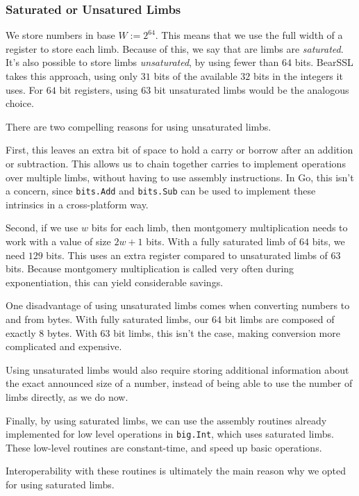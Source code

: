 \documentclass[11pt, a4paper]{article} %
\begin{document}
{\subsubsection{Saturated or Unsatured Limbs}

We store numbers in base
$W := 2^{64}$. This means that we use the full width of a register
to store each limb. Because of this, we say that are limbs
are \textit{saturated}. It's also possible to store
limbs \textit{unsaturated}, by using fewer than $64$ bits.
BearSSL 
\cite{pornin_bearssl_2020-1}
takes this approach, using only $31$ bits of the available $32$ bits
in the integers it uses. For $64$ bit registers, using $63$ bit unsaturated
limbs would be the analogous choice.

There are two compelling reasons for using unsaturated limbs.

First, this leaves an extra bit of space to hold a carry
or borrow after an addition or subtraction. This allows
us to chain together carries to implement operations over multiple
limbs, without having to use assembly instructions. In Go,
this isn't a concern, since \texttt{bits.Add} and
\texttt{bits.Sub} can be used to implement these intrinsics
in a cross-platform way.

Second, if we use $w$ bits for each limb, then montgomery
multiplication needs to work with a value of size $2w + 1$ bits. With a fully
saturated limb of $64$ bits, we need $129$ bits. This uses
an extra register compared to unsaturated limbs of $63$ bits. Because
montgomery multiplication is called very often during exponentiation,
this can yield considerable savings.

One disadvantage of using unsaturated limbs comes when converting
numbers to and from bytes. With fully saturated limbs, our
$64$ bit limbs are composed of exactly $8$ bytes. With $63$ bit limbs,
this isn't the case, making conversion more
complicated and expensive.

Using unsaturated limbs would
also require storing additional information about the exact
announced size of a number, instead of being able to use
the number of limbs directly, as we do now.

Finally, by using saturated limbs, we can use the assembly routines
already implemented for low level operations
in \texttt{big.Int}, which uses saturated limbs. These low-level
routines are constant-time, and speed up basic operations.

Interoperability with these routines
is ultimately the main reason why we opted
for using saturated limbs.

}
\end{document}
